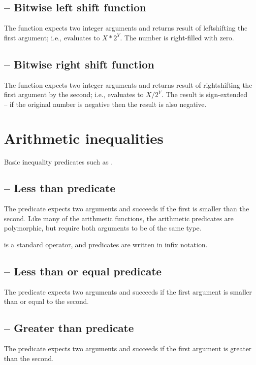 \subsection{ -- Bitwise left shift function}
The  function expects two integer arguments and returns result of leftshifting the first argument; i.e.,  evaluates to $X*2^{Y}$. The number is right-filled with zero.
      
\subsection{ -- Bitwise right shift function}
The  function expects two integer arguments and returns result of rightshifting the first argument by the second; i.e.,  evaluates to $X/2^{Y}$. The result is sign-extended -- if the original number is negative then the result is also negative.

\section{Arithmetic inequalities}
\label{arith:ineq}

Basic inequality predicates such as \function{<}.
  
\subsection{\function{<} -- Less than predicate}
The \function{<} predicate expects two arguments and succeeds if the first is smaller than the second. Like many of the arithmetic functions, the arithmetic predicates are polymorphic, but require both arguments to be of the same type. 

\q{<} is a standard operator, and \q{<} predicates are written in infix notation.

\subsection{\function{=<} -- Less than or equal predicate}
The \function{=<} predicate expects two arguments and succeeds if the first argument is smaller than or equal to the second.

\subsection{\function{>} -- Greater than predicate}
The \function{>} predicate expects two arguments and succeeds if the first argument is greater than the second.

